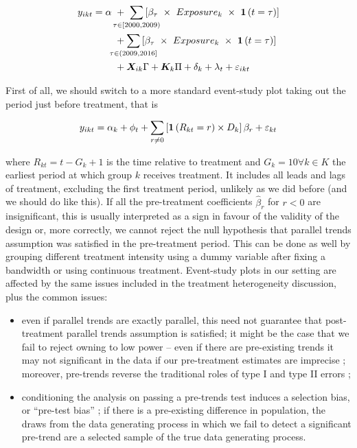 \documentclass[11pt]{article}
\begin{document}
\begin{equation}
    \begin{aligned}
    y_{ikt} = \alpha \ &+ \ \smashoperator{\sum_{\tau \in \left[2000, 2009\right)}} \squares{\beta_{\tau} \ \times \ Exposure_{k} \ \times \ \ind{t = \tau}} \\
    &+ \smashoperator{\sum_{\tau \in \left(2009, 2016\right]}} \squares{\beta_{\tau} \ \times \ Exposure_{k} \ \times \ \ind{t = \tau}} \\
    &+ \bm{X}_{ik} \Gamma + \bm{K}_{k} \Pi + \delta_{k} + \lambda_{t} + \varepsilon_{ikt} \label{eq:oldpretrends}
    \end{aligned}
\end{equation}

First of all, we should switch to a more standard event-study plot taking out the period just before treatment, that is

\begin{equation}
    y_{ikt} = \alpha_{k} + \phi_{t} + \sum_{r \neq 0} \left[ \mathbf{1}\left( R_{kt} = r \right) \times D_{k} \right] \beta_{r} + \varepsilon_{kt}
\end{equation}

where $R_{kt} = t - G_{k} + 1$ is the time relative to treatment and $G_{k} = 10 \forall k \in K$ the earliest period at which group $k$ receives treatment. It includes all leads and lags of treatment, excluding the first treatment period, unlikely as we did before (and we should do like this).
If all the pre-treatment coefficients $\hat{\beta}_{r}$ for $r < 0$ are insignificant, this is usually interpreted as a sign in favour of the validity of the design or, more correctly, we cannot reject the null hypothesis that parallel trends assumption was satisfied in the pre-treatment period. This can be done as well by grouping different treatment intensity using a dummy variable after fixing a bandwidth or using continuous treatment. Event-study plots in our setting are affected by the same issues included in the treatment heterogeneity discussion, plus the common issues:

\begin{itemize}
    \item even if parallel trends are exactly parallel, this need not guarantee that post-treatment parallel trends assumption is satisfied; it might be the case that we fail to reject owning to low power -- even if there are pre-existing trends it may not significant in the data if our pre-treatment estimates are imprecise \citep{bib:bilinski2018,bib:kahn-lang2020}; moreover, pre-trends reverse the traditional roles of type I and type II errors \citep{bib:freyaldenhoven2019};
    \item conditioning the analysis on passing a pre-trends test induces a selection bias, or ``pre-test bias'' \citep{bib:roth2021}; if there is a pre-existing difference in population, the draws from the data generating process in which we fail to detect a significant pre-trend are a selected sample of the true data generating process.
\end{itemize}
\end{document}
